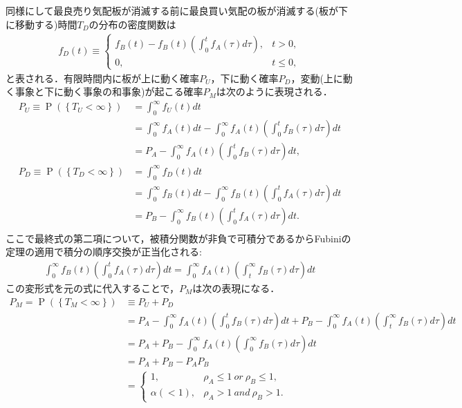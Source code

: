 \documentclass[a4j,papersize,disablejfam,slide,14pt]{jsarticle}
\def\prob#1{\operatorname{P} \left(\left\{ #1 \right\}\right)} %
\begin{document}
    同様にして最良売り気配板が消滅する前に最良買い気配の板が消滅する(板が下に移動する)時間$T_D$の分布の密度関数は
    \begin{align}
    	f_D(t) \equiv \begin{cases}
        	f_B(t) - f_B(t)\left( \int_{0}^{t}f_A(\tau)d\tau \right), & t>0, \\
            0, & t \leq 0,
        \end{cases}
    \end{align}
    と表される．有限時間内に板が上に動く確率$P_U$，下に動く確率$P_D$，変動(上に動く事象と下に動く事象の和事象)が起こる確率$P_M$は次のように表現される．
    \begin{align}
    	P_U \equiv \prob{T_U < \infty} &= \int_{0}^{\infty} f_U(t) dt \\
        &= \int_{0}^{\infty} f_A(t)dt - \int_{0}^{\infty} f_A(t) \left( \int_{0}^{t} f_B(\tau)d\tau \right) dt \\
        &= P_A - \int_{0}^{\infty} f_A(t) \left( \int_{0}^{t} f_B(\tau)d\tau \right) dt, \\
        P_D \equiv \prob{T_D < \infty} &= \int_{0}^{\infty} f_D(t) dt \\
        &= \int_{0}^{\infty} f_B(t)dt - \int_{0}^{\infty} f_B(t) \left( \int_{0}^{t} f_A(\tau)d\tau \right) dt \\
        &= P_B - \int_{0}^{\infty} f_B(t) \left( \int_{0}^{t} f_A(\tau)d\tau \right) dt. \\
    \end{align}
    ここで最終式の第二項について，被積分関数が非負で可積分であるから{\rm Fubini}の定理の適用で積分の順序交換が正当化される:
    \begin{align}
    	\int_{0}^{\infty} f_B(t) \left( \int_{0}^{t} f_A(\tau)d\tau \right) dt = \int_{0}^{\infty} f_A(t) \left( \int_{t}^{\infty} f_B(\tau)d\tau \right) dt
    \end{align}
    この変形式を元の式に代入することで，$P_M$は次の表現になる．
    \begin{align}
    	P_M = \prob{T_M < \infty} &\equiv P_U + P_D \\
        &= P_A - \int_{0}^{\infty} f_A(t) \left( \int_{0}^{t} f_B(\tau)d\tau \right) dt + 
        	P_B - \int_{0}^{\infty} f_A(t) \left( \int_{t}^{\infty} f_B(\tau)d\tau \right) dt \\
        &= P_A + P_B - \int_{0}^{\infty} f_A(t) \left( \int_{0}^{\infty} f_B(\tau)d\tau \right) dt \\
        &= P_A + P_B - P_A P_B \\
        &= \begin{cases}
        	1, & \rho_A \leq 1\ or\ \rho_B \leq 1, \\
            \alpha(< 1), & \rho_A > 1\ and\ \rho_B > 1.
        \end{cases}
    \end{align}
    
\end{document}
